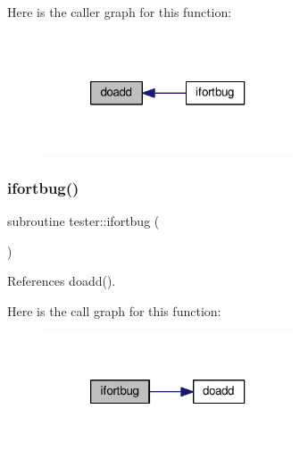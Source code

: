 Here is the caller graph for this function\+:
\nopagebreak
\begin{figure}[H]
\begin{center}
\leavevmode
\includegraphics[width=210pt]{general__unittests_8f90_a5fbc3ab2a5412f1158793fbf4cdceff0_icgraph}
\end{center}
\end{figure}
\mbox{\label{general__unittests_8f90_a0d741a25cd31d879b5d33dd390fc241c}} 
\subsubsection{\texorpdfstring{ifortbug()}{ifortbug()}}
{\footnotesize\ttfamily subroutine tester\+::ifortbug (\begin{DoxyParamCaption}{ }\end{DoxyParamCaption})}



References doadd().

Here is the call graph for this function\+:
\nopagebreak
\begin{figure}[H]
\begin{center}
\leavevmode
\includegraphics[width=210pt]{general__unittests_8f90_a0d741a25cd31d879b5d33dd390fc241c_cgraph}
\end{center}
\end{figure}
\mbox{\label{general__unittests_8f90_abb1af5b22eb90cec23fca42accb63245}} 
